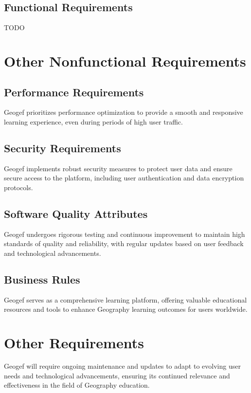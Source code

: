 \documentclass{scrreprt}
\begin{document}
\section{Functional Requirements}
TODO

\chapter{Other Nonfunctional Requirements}

\section{Performance Requirements}
Geogef prioritizes performance optimization to provide a smooth and responsive learning experience, even during periods of high user traffic.

\section{Security Requirements}
Geogef implements robust security measures to protect user data and ensure secure access to the platform, including user authentication and data encryption protocols.

\section{Software Quality Attributes}
Geogef undergoes rigorous testing and continuous improvement to maintain high standards of quality and reliability, with regular updates based on user feedback and technological advancements.

\section{Business Rules}
Geogef serves as a comprehensive learning platform, offering valuable educational resources and tools to enhance Geography learning outcomes for users worldwide.

\chapter{Other Requirements}

Geogef will require ongoing maintenance and updates to adapt to evolving user needs and technological advancements, ensuring its continued relevance and effectiveness in the field of Geography education.
\end{document}
